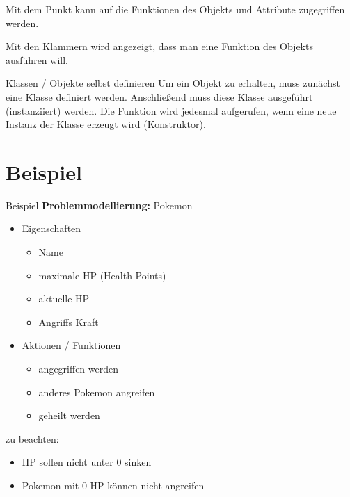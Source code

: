 \begin{frame}
	Mit dem Punkt  kann auf die Funktionen des Objekts und Attribute zugegriffen werden.
	
	Mit den Klammern wird angezeigt, dass man eine Funktion des Objekts ausführen will.
	
\end{frame}
\begin{frame}{Klassen / Objekte selbst definieren}
	Um ein Objekt zu erhalten, muss zunächst eine Klasse definiert werden. Anschließend muss diese Klasse ausgeführt (instanziiert) werden. Die  Funktion wird jedesmal aufgerufen, wenn eine neue Instanz der Klasse erzeugt wird (Konstruktor).
	
	
\end{frame}

\section*{Beispiel}
\begin{frame}{Beispiel}
	\textbf{Problemmodellierung:}
	Pokemon
	\begin{itemize}
		\item Eigenschaften
		\begin{itemize}
			\item Name
			\item maximale HP (Health Points)
			\item aktuelle HP
			\item Angriffs Kraft
		\end{itemize}
		\item Aktionen / Funktionen
		\begin{itemize}
			\item angegriffen werden
			\item anderes Pokemon angreifen
			\item geheilt werden
		\end{itemize}
	\end{itemize}
	zu beachten:
	\begin{itemize}
		\item HP sollen nicht unter 0 sinken
		\item Pokemon mit 0 HP können nicht angreifen
	\end{itemize}

\end{frame}

